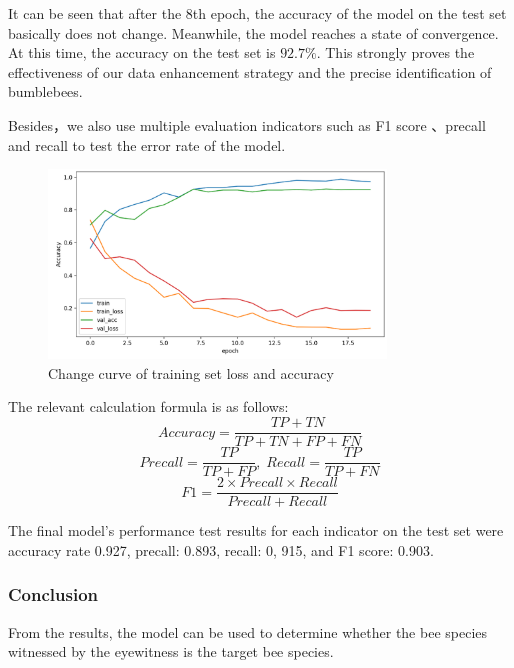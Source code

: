 \documentclass{mcmthesis}
\begin{document}
It can be seen that after the 8th epoch, the accuracy of the model on the test set basically does not change. Meanwhile, the model reaches a state of convergence. At this time, the accuracy on the test set is $ 92.7\% $. 
This strongly proves the effectiveness of our data enhancement strategy and the precise identification of bumblebees.

Besides，we also use multiple evaluation indicators such as F1 score 、precall and recall  to test the error rate of the model. 

\begin{figure}[H]
	\centering
	\includegraphics[width=0.8\textwidth]{screenshot018}
	\caption{Change curve of training set loss and accuracy}
	\label{fig:screenshot018}
\end{figure}

The relevant calculation formula is as follows:
\begin{equation}
	Accuracy=\frac{TP+TN}{TP+TN+FP+FN}
\end{equation}
\begin{equation}
	Precall=\frac{TP}{TP+FP},\;Recall=\frac{TP}{TP+FN}
\end{equation}
\begin{equation}
	F1=\frac{2\times Precall\times Recall}{Precall+Recall}
\end{equation}

The final model's performance test results for each indicator on the test set were accuracy rate 0.927, precall: 0.893, recall: 0, 915, and F1 score: 0.903.

\hspace*{\fill}
\subsubsection{Conclusion}
From the results, the model can be used to determine whether the bee species witnessed by the eyewitness is the target bee species.
\end{document}
